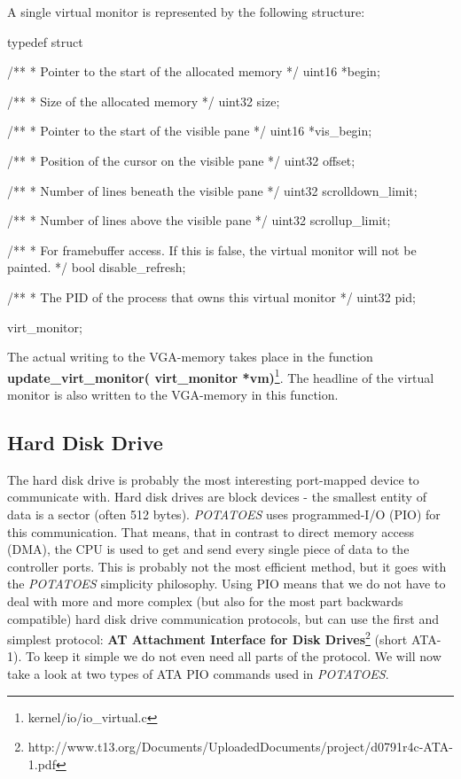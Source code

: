 \documentclass[11pt,a4paper]{scrartcl}
\begin{document}
A single virtual monitor is represented by the following structure:
\begin{code}
typedef struct {
	/**
	 * Pointer to the start of the allocated memory
	 */
	uint16 *begin;
	
	/**
	 * Size of the allocated memory
	 */
	uint32 size;
	
	/**
	 * Pointer to the start of the visible pane
	 */
	uint16 *vis_begin;
	
	/**
	 * Position of the cursor on the visible pane
	 */
	uint32 offset;
	
	/**
	 * Number of lines beneath the visible pane
	 */
	uint32 scrolldown_limit;
	
	/**
	 * Number of lines above the visible pane
	 */
	uint32 scrollup_limit;
	
	/**
	 * For framebuffer access. If this is false, the virtual monitor will not be painted.
	 */
	bool disable_refresh;
	
	/**
	 * The PID of the process that owns this virtual monitor
	 */
	uint32 pid;
}virt_monitor;
\end{code}

The actual writing to the VGA-memory takes place in the function \textbf{update\_virt\_monitor( virt\_monitor *vm)}\footnote{kernel/io/io\_virtual.c}. The headline of the virtual monitor is also written to the VGA-memory in this function.

\subsection{Hard Disk Drive}
\hypertarget{IDE}{}
The hard disk drive is probably the most interesting port-mapped device to communicate with. Hard disk drives are block devices - the smallest entity of data is a sector (often 512 bytes). \textit{POTATOES} uses programmed-I/O (PIO) for this communication. That means, that in contrast to direct memory access (DMA), the CPU is used to get and send every single piece of data to the controller ports. This is probably not the most efficient method, but it goes with the \textit{POTATOES} simplicity philosophy. Using PIO means that we do not have to deal with more and more complex (but also for the most part backwards compatible) hard disk drive communication protocols, but can use the first and simplest protocol: \textbf{AT Attachment Interface for Disk Drives}\footnote{http://www.t13.org/Documents/UploadedDocuments/project/d0791r4c-ATA-1.pdf} (short ATA-1). To keep it simple we do not even need all parts of the protocol. We will now take a look at two types of ATA PIO commands used in \textit{POTATOES}.
\end{document}
